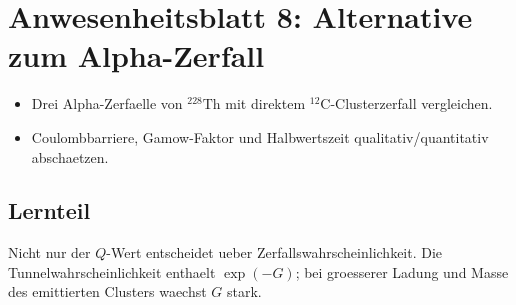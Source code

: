 \documentclass[11pt,a4paper]{scrartcl}
\begin{document}
\section{Anwesenheitsblatt 8: Alternative zum Alpha-Zerfall}
\begin{taskbox}\begin{itemize}\item Drei Alpha-Zerfaelle von \(^{228}\mathrm{Th}\) mit direktem \(^{12}\mathrm C\)-Clusterzerfall vergleichen.\item Coulombbarriere, Gamow-Faktor und Halbwertszeit qualitativ/quantitativ abschaetzen.\end{itemize}\end{taskbox}
\subsection{Lernteil}\begin{learningbox}Nicht nur der \(Q\)-Wert entscheidet ueber Zerfallswahrscheinlichkeit. Die Tunnelwahrscheinlichkeit enthaelt \(\exp(-G)\); bei groesserer Ladung und Masse des emittierten Clusters waechst \(G\) stark.\end{learningbox}
\end{document}
